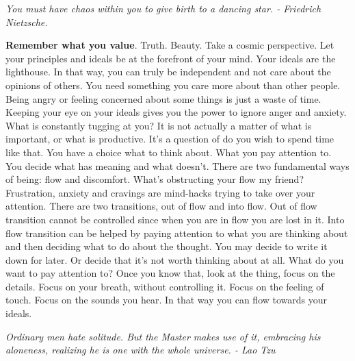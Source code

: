 \documentclass[a4paper,hidelinks]{article}
\begin{document}

\begin{center}
\textit{You must have chaos within you to give birth to a dancing star. - Friedrich Nietzsche.}
\end{center}

\textbf{Remember what you value}.
Truth.
Beauty.
Take a cosmic perspective.
Let your principles and ideals be at the forefront of your mind.
Your ideals are the lighthouse.
In that way, you can truly be independent and not care about the opinions of others.
You need something you care more about than other people.
Being angry or feeling concerned about some things is just a waste of time.
Keeping your eye on your ideals gives you the power to ignore anger and anxiety.
What is constantly tugging at you?
It is not actually a matter of what is important, or what is productive.
It's a question of do you wish to spend time like that.
You have a choice what to think about.
What you pay attention to.
You decide what has meaning and what doesn’t.
There are two fundamental ways of being: flow and discomfort.
What's obstructing your flow my friend?
Frustration, anxiety and cravings are mind-hacks trying to take over your attention.
There are two transitions, out of flow and into flow.
Out of flow transition cannot be controlled since when you are in flow you are lost in it.
Into flow transition can be helped by paying attention to what you are thinking about and then deciding what to do about the thought.
You may decide to write it down for later.
Or decide that it's not worth thinking about at all.
What do you want to pay attention to?
Once you know that, look at the thing, focus on the details.
Focus on your breath, without controlling it.
Focus on the feeling of touch.
Focus on the sounds you hear.
In that way you can flow towards your ideals.

\newpage

\begin{center}
\textit{Ordinary men hate solitude. But the Master makes use of it, embracing his aloneness, realizing he is one with the whole universe. - Lao Tzu}
\end{center}
\end{document}
